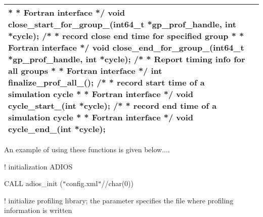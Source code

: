 \begin{longtable}{|p{4.448in}|p{0.052in}|}
\begin{minipage}[t]{4.448in}
*\linebreak
* Fortran interface\linebreak
*/\linebreak
void close\_start\_for\_group\_(int64\_t *gp\_prof\_handle, int *cycle);\linebreak
/*\linebreak
* record close end time for specified group\linebreak
*\linebreak
* Fortran interface\linebreak
*/\linebreak
void close\_end\_for\_group\_(int64\_t *gp\_prof\_handle, int *cycle);\linebreak
/*\linebreak
* Report timing info for all groups\linebreak
*\linebreak
* Fortran interface  \linebreak
*/\linebreak
int finalize\_prof\_all\_();\linebreak
/*\linebreak
* record start time of a simulation cycle\linebreak
*\linebreak
* Fortran interface \linebreak
*/\linebreak
void cycle\_start\_(int *cycle);\linebreak
/*\linebreak
* record end time of a simulation cycle\linebreak
*\linebreak
* Fortran interface \linebreak
*/\linebreak
void cycle\_end\_(int *cycle);\end{minipage}\\
\hline
\end{longtable}

\vspace{142pt}
An example of using these functions is given below....

\vspace{23pt}
! initialization ADIOS

\vspace{10pt}
CALL adios\_init (\texttt{"}config.xml\texttt{"}//char(0))

\vspace{10pt}
! initialize profiling library; the parameter specifies the file where profiling 
information is written

